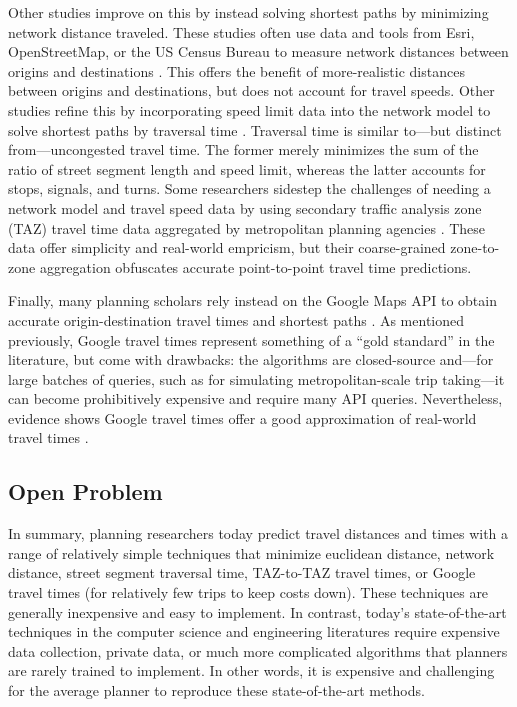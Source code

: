 \documentclass[12pt,letterpaper]{article} %
\begin{document}
Other studies improve on this by instead solving shortest paths by minimizing network distance traveled. These studies often use data and tools from Esri, OpenStreetMap, or the US Census Bureau to measure network distances between origins and destinations \citep[e.g.,][]{mckenzie2020urban, jiao2021measuring, nicoletti2023disadvantaged, logan2019evaluating, tsou2005accessibility}. This offers the benefit of more-realistic distances between origins and destinations, but does not account for travel speeds. Other studies refine this by incorporating speed limit data into the network model to solve shortest paths by traversal time \citep{kuai2017examining,williams2020parks,he2020evaluating,salonen2013modelling,scott2008role,neutens2010equity,wang2013planning}. Traversal time is similar to---but distinct from---uncongested travel time. The former merely minimizes the sum of the ratio of street segment length and speed limit, whereas the latter accounts for stops, signals, and turns. Some researchers sidestep the challenges of needing a network model and travel speed data by using secondary traffic analysis zone (TAZ) travel time data aggregated by metropolitan planning agencies \citep[e.g.,][]{grengs2010intermetropolitan,yan2021toward,levine2012does}. These data offer simplicity and real-world empricism, but their coarse-grained zone-to-zone aggregation obfuscates accurate point-to-point travel time predictions.

Finally, many planning scholars rely instead on the Google Maps API to obtain accurate origin-destination travel times and shortest paths \citep[e.g.,][]{fielbaum2021assessment,costa2021spatial, swayne2021integrating,hu2020estimating,cuervo2022dynamic,chen2020communities,hwang2024measuring}. As mentioned previously, Google travel times represent something of a \enquote{gold standard} in the literature, but come with drawbacks: the algorithms are closed-source and---for large batches of queries, such as for simulating metropolitan-scale trip taking---it can become prohibitively expensive and require many API queries. Nevertheless, evidence shows Google travel times offer a good approximation of real-world travel times \citep{lin2021impact,fu2023comparative,alsobky2020estimating,wang2011estimating}.

\subsection{Open Problem}

In summary, planning researchers today predict travel distances and times with a range of relatively simple techniques that minimize euclidean distance, network distance, street segment traversal time, TAZ-to-TAZ travel times, or Google travel times (for relatively few trips to keep costs down). These techniques are generally inexpensive and easy to implement. In contrast, today's state-of-the-art techniques in the computer science and engineering literatures require expensive data collection, private data, or much more complicated algorithms that planners are rarely trained to implement. In other words, it is expensive and challenging for the average planner to reproduce these state-of-the-art methods.
\end{document}

